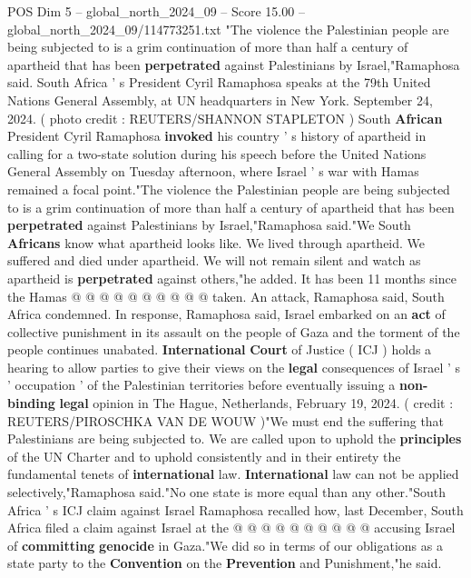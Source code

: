 \begin{textsample}{POS Dim 5 – global\_north\_2024\_09 – Score 15.00 – global\_north\_2024\_09/114773251.txt}  \label{ex:f5_pos_354}
"The violence the Palestinian people are being subjected to is a grim continuation of more than half a century of apartheid that has been \textbf{perpetrated} against Palestinians by Israel,"Ramaphosa said.
South Africa ' s President Cyril Ramaphosa speaks at the 79th United Nations General Assembly, at UN headquarters in New York.
September 24, 2024. ( photo credit : REUTERS/SHANNON STAPLETON ) South \textbf{African} President Cyril Ramaphosa \textbf{invoked} his country ' s history of apartheid in calling for a two-state solution during his speech before the United Nations General Assembly on Tuesday afternoon, where Israel ' s war with Hamas remained a focal point."The violence the Palestinian people are being subjected to is a grim continuation of more than half a century of apartheid that has been \textbf{perpetrated} against Palestinians by Israel,"Ramaphosa said."We South \textbf{Africans} know what apartheid looks like.
We lived through apartheid.
We suffered and died under apartheid.
We will not remain silent and watch as apartheid is \textbf{perpetrated} against others,"he added.
It has been 11 months since the Hamas @ @ @ @ @ @ @ @ @ @ taken.
An attack, Ramaphosa said, South Africa condemned.
In response, Ramaphosa said, Israel embarked on an \textbf{act} of collective punishment in its assault on the people of Gaza and the torment of the people continues unabated. \textbf{International} \textbf{Court} of Justice ( ICJ ) holds a hearing to allow parties to give their views on the \textbf{legal} consequences of Israel ' s ' occupation ' of the Palestinian territories before eventually issuing a \textbf{non-binding} \textbf{legal} opinion in The Hague, Netherlands, February 19, 2024. ( credit : REUTERS/PIROSCHKA VAN DE WOUW )"We must end the suffering that Palestinians are being subjected to.
We are called upon to uphold the \textbf{principles} of the UN Charter and to uphold consistently and in their entirety the fundamental tenets of \textbf{international} law. \textbf{International} law can not be applied selectively,"Ramaphosa said."No one state is more equal than any other."South Africa ' s ICJ claim against Israel Ramaphosa recalled how, last December, South Africa filed a claim against Israel at the @ @ @ @ @ @ @ @ @ @ accusing Israel of \textbf{committing} \textbf{genocide} in Gaza."We did so in terms of our obligations as a state party to the \textbf{Convention} on the \textbf{Prevention} and Punishment,"he said.

\end{textsample}
